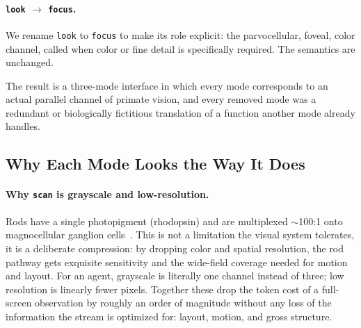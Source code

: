 \documentclass[11pt,a4paper]{article}
\begin{document}
\paragraph{\texttt{look} $\to$ \texttt{focus}.}
We rename \texttt{look} to \texttt{focus} to make its role explicit: the
parvocellular, foveal, color channel, called when color or fine detail is
specifically required. The semantics are unchanged.

\medskip
\noindent
The result is a three-mode interface in which every mode corresponds to an
actual parallel channel of primate vision, and every removed mode was a
redundant or biologically fictitious translation of a function another mode
already handles.

\subsection{Why Each Mode Looks the Way It Does}
\label{sec:mode-rationale}

\paragraph{Why \texttt{scan} is grayscale and low-resolution.}
Rods have a single photopigment (rhodopsin) and are multiplexed $\sim$100:1
onto magnocellular ganglion cells~\cite{curcio-photoreceptor}. This is not a
limitation the visual system tolerates, it is a deliberate compression: by
dropping color and spatial resolution, the rod pathway gets exquisite
sensitivity and the wide-field coverage needed for motion and layout. For an
agent, grayscale is literally one channel instead of three; low resolution is
linearly fewer pixels. Together these drop the token cost of a full-screen
observation by roughly an order of magnitude without any loss of the
information the stream is optimized for: layout, motion, and gross structure.
\end{document}
